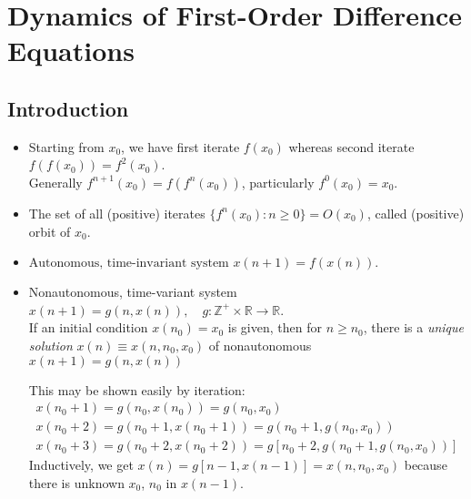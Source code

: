\chapter{Dynamics of First-Order Difference Equations}
\section{Introduction}
\begin{itemize}
    \item Starting from $x_0$, we have first iterate $f(x_0)$ whereas second iterate $f(f(x_0))=f^2(x_0)$. \\
        Generally $f^{n+1}(x_0)=f(f^{n}(x_0))$, particularly $f^0(x_0)=x_0$.
    \item The set of all (positive) iterates $\{f^n(x_0):n\geq 0\}=O(x_0)$, called (positive) orbit of $x_0$.
    \item $\text{Autonomous, time-invariant system }x(n+1)=f(x(n)).$
    \item Nonautonomous, time-variant system $x(n+1)=g(n,x(n)),\quad g: \mathbb{Z}^+ \times\mathbb{R}\to\mathbb{R}$. \\
        If an initial condition $x(n_0)=x_0$ is given, then for $n\geq n_0$, there is a \textit{unique solution} $x(n)\equiv x(n,n_0,x_0)$ of nonautonomous $x(n+1)=g(n,x(n))$
        \begin{explanation}
            This may be shown easily by iteration:
            \[
            \begin{array}{l}
                x(n_0+1)=g(n_0,x(n_0))=g(n_0,x_0) \\
                x(n_0+2)=g(n_0+1,x(n_0+1))=g(n_0+1,g(n_0,x_0)) \\
                x(n_0+3)=g(n_0+2,x(n_0+2))=g[n_0+2,g(n_0+1,g(n_0,x_0))]
            \end{array}
        \]
        Inductively, we get $x(n)=g[n-1,x(n-1)]=x(n,n_0,x_0)$ because there is unknown $x_0$, $n_0$ in $x(n-1)$.
        \end{explanation}
\end{itemize}

